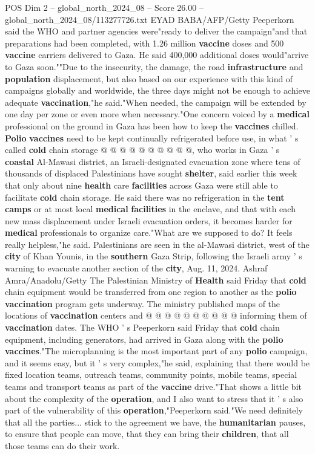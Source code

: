 \begin{textsample}{POS Dim 2 – global\_north\_2024\_08 – Score 26.00 – global\_north\_2024\_08/113277726.txt}
EYAD BABA/AFP/Getty Peeperkorn said the WHO and partner agencies were"ready to deliver the campaign"and that preparations had been completed, with 1.26 million \textbf{vaccine} doses and 500 \textbf{vaccine} carriers delivered to Gaza.
He said 400,000 additional doses would"arrive to Gaza soon.""Due to the insecurity, the damage, the road \textbf{infrastructure} and \textbf{population} displacement, but also based on our experience with this kind of campaigns globally and worldwide, the three days might not be enough to achieve adequate \textbf{vaccination},"he said."When needed, the campaign will be extended by one day per zone or even more when necessary."One concern voiced by a \textbf{medical} professional on the ground in Gaza has been how to keep the \textbf{vaccines} chilled. \textbf{Polio} \textbf{vaccines} need to be kept continually refrigerated before use, in what ' s called \textbf{cold} chain storage @ @ @ @ @ @ @ @ @ @, who works in Gaza ' s \textbf{coastal} Al-Mawasi district, an Israeli-designated evacuation zone where tens of thousands of displaced Palestinians have sought \textbf{shelter}, said earlier this week that only about nine \textbf{health} care \textbf{facilities} across Gaza were still able to facilitate \textbf{cold} chain storage.
He said there was no refrigeration in the \textbf{tent} \textbf{camps} or at most local \textbf{medical} \textbf{facilities} in the enclave, and that with each new mass displacement under Israeli evacuation orders, it becomes harder for \textbf{medical} professionals to organize care."What are we supposed to do?
It feels really helpless,"he said.
Palestinians are seen in the al-Mawasi district, west of the \textbf{city} of Khan Younis, in the \textbf{southern} Gaza Strip, following the Israeli army ' s warning to evacuate another section of the \textbf{city}, Aug. 11, 2024.
Ashraf Amra/Anadolu/Getty The Palestinian Ministry of \textbf{Health} said Friday that \textbf{cold} chain equipment would be transferred from one region to another as the \textbf{polio} \textbf{vaccination} program gets underway.
The ministry published maps of the locations of \textbf{vaccination} centers and @ @ @ @ @ @ @ @ @ @ informing them of \textbf{vaccination} dates.
The WHO ' s Peeperkorn said Friday that \textbf{cold} chain equipment, including generators, had arrived in Gaza along with the \textbf{polio} \textbf{vaccines}."The microplanning is the most important part of any \textbf{polio} campaign, and it seems easy, but it ' s very complex,"he said, explaining that there would be fixed location teams, outreach teams, community points, mobile teams, special teams and transport teams as part of the \textbf{vaccine} drive."That shows a little bit about the complexity of the \textbf{operation}, and I also want to stress that it ' s also part of the vulnerability of this \textbf{operation},"Peeperkorn said."We need definitely that all the parties... stick to the agreement we have, the \textbf{humanitarian} pauses, to ensure that people can move, that they can bring their \textbf{children}, that all those teams can do their work.

\end{textsample}
